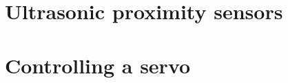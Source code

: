 \documentclass{article}
\begin{document}
\section{Ultrasonic proximity sensors}


\section{Controlling a servo}

\end{document}
